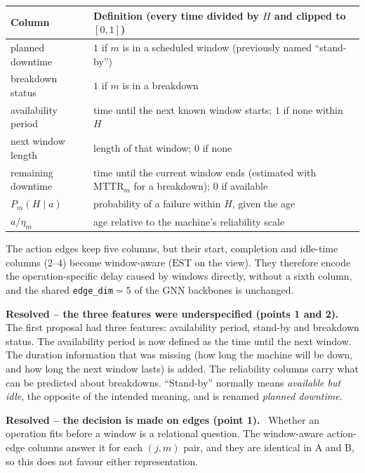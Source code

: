 \documentclass[11pt,a4paper]{article}
\newenvironment{resolved}[1]{%
  \par\medskip\noindent\textbf{\color{resolved}Resolved -- #1.}\ }{\par\medskip}
\newcommand{\EST}{\mathrm{EST}}
\newcommand{\code}[1]{\texttt{#1}}
\begin{document}
\begin{center}
\begin{tabularx}{\textwidth}{@{}l X@{}}
\toprule
Column & Definition (every time divided by $H$ and clipped to $[0,1]$) \\
\midrule
planned downtime & $1$ if $m$ is in a scheduled window (previously named ``stand-by'') \\
breakdown status & $1$ if $m$ is in a breakdown \\
availability period & time until the next known window starts; $1$ if none within $H$ \\
next window length & length of that window; $0$ if none \\
remaining downtime & time until the current window ends (estimated with $\mathrm{MTTR}_m$ for a breakdown); $0$ if available \\
$P_m(H\mid a)$ & probability of a failure within $H$, given the age \\
$a/\eta_m$ & age relative to the machine's reliability scale \\
\bottomrule
\end{tabularx}
\end{center}

\noindent The action edges keep five columns, but their start, completion and idle-time columns
(2--4) become window-aware ($\EST$ on the view). They therefore encode the operation-specific
delay caused by windows directly, without a sixth column, and the shared \code{edge\_dim}$=5$
of the GNN backbones is unchanged.

\begin{resolved}{the three features were underspecified (points 1 and 2)}
The first proposal had three features: availability period, stand-by and breakdown status. The
availability period is now defined as the time until the next window. The duration information
that was missing (how long the machine will be down, and how long the next window lasts) is
added. The reliability columns carry what can be predicted about breakdowns. ``Stand-by''
normally means \emph{available but idle}, the opposite of the intended meaning, and is renamed
\emph{planned downtime}.
\end{resolved}

\begin{resolved}{the decision is made on edges (point 1)}
Whether an operation fits before a window is a relational question. The window-aware action-edge
columns answer it for each $(j,m)$ pair, and they are identical in A and B, so this does not
favour either representation.
\end{resolved}
\end{document}
